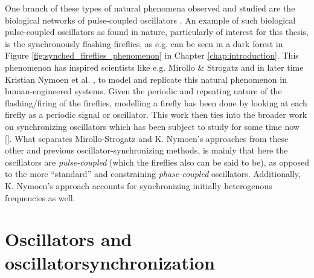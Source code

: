 One branch of these types of natural phenomena observed and studied are the biological networks of pulse-coupled oscillators \cite{proskurnikov_synchronization_2016, neda2000selfsorganizing}. An example of such biological pulse-coupled oscillators as found in nature, particularly of interest for this thesis, is the synchronously flashing fireflies, as e.g. can be seen in a dark forest in Figure \ref{fig:synched_fireflies_phenomenon} in Chapter \ref{chap:introduction}. This phenomenon has inspired scientists like e.g. Mirollo \& Strogatz \cite{mirollo_strogatz_PCO_synch} and in later time Kristian Nymoen et al. \cite{nymoen_synch}, to model and replicate this natural phenomenon in human-engineered systems. Given the periodic and repeating nature of the flashing/firing of the fireflies, modelling a firefly has been done by looking at each firefly as a periodic signal or oscillator. This work \cite{mirollo_strogatz_PCO_synch, nymoen_synch} then ties into the broader work on synchronizing oscillators which has been subject to study for some time now []. What separates Mirollo-Strogatz and K. Nymoen's approaches from these other and previous oscillator-synchronizing methods, is mainly that here the oscillators are \textit{pulse-coupled} (which the fireflies also can be said to be), as opposed to the more ``standard'' and constraining \textit{phase-coupled} oscillators. Additionally, K. Nymoen's approach accounts for synchronizing initially heterogenous frequencies as well.




\section{Oscillators and oscillatorsynchronization}





